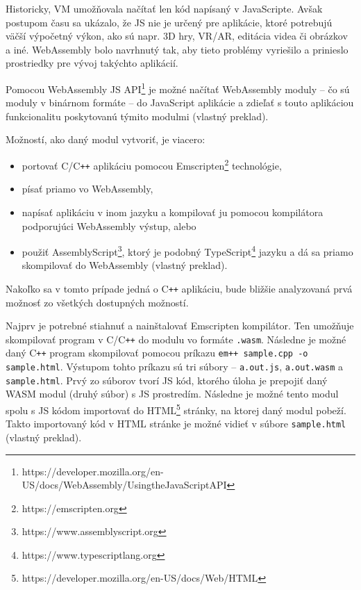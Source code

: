 Historicky, VM umožňovala načítať len kód napísaný v JavaScripte. Avšak postupom času sa ukázalo, že JS nie je určený pre aplikácie, ktoré potrebujú väčší výpočetný výkon, ako sú napr. 3D hry, VR/AR, editácia videa či obrázkov a iné.
WebAssembly bolo navrhnutý tak, aby tieto problémy vyriešilo a prinieslo prostriedky pre vývoj takýchto aplikácií. 

Pomocou WebAssembly JS API\footnote{https://developer.mozilla.org/en-US/docs/WebAssembly/Using\textunderscore the\textunderscore JavaScript\textunderscore API} je možné načítať WebAssembly moduly -- čo sú moduly v binárnom formáte -- do JavaScript aplikácie a zdieľať s touto aplikáciou funkcionalitu poskytovanú týmito modulmi \cite{webassembly_concepts} (vlastný preklad).

Možností, ako daný modul vytvoriť, je viacero:
\begin {itemize}
\item {portovať C/C\texttt{++} aplikáciu pomocou Emscripten\footnote{https://emscripten.org} technológie,}
\item {písať priamo vo WebAssembly,}
\item {napísať aplikáciu v inom jazyku a kompilovať ju pomocou kompilátora podporujúci WebAssembly výstup, alebo}
\item {použiť AssemblyScript\footnote{https://www.assemblyscript.org}, ktorý je podobný TypeScript\footnote{https://www.typescriptlang.org} jazyku a dá sa priamo skompilovať do WebAssembly \cite{webassembly_concepts} (vlastný preklad).}
\end {itemize}

Nakoľko sa v tomto prípade jedná o C\texttt{++} aplikáciu, bude bližšie analyzovaná prvá možnosť zo všetkých dostupných možností.

Najprv je potrebné stiahnuť a nainštalovať Emscripten kompilátor. Ten umožňuje skompilovať program v C/C\texttt{++} do modulu vo formáte \texttt{.wasm}. Následne je možné daný C\texttt{++} program skompilovať pomocou príkazu \newline \texttt{em++ sample.cpp -o sample.html}. Výstupom tohto príkazu sú tri súbory -- \newline \texttt{a.out.js}, \texttt{a.out.wasm} a \texttt{sample.html}. Prvý zo súborov tvorí JS kód, ktorého úloha je prepojiť daný WASM modul (druhý súbor) s JS prostredím. Následne je možné tento modul spolu s JS kódom importovať do HTML\footnote{https://developer.mozilla.org/en-US/docs/Web/HTML} stránky, na ktorej daný modul pobeží. Takto importovaný kód v HTML stránke je možné vidieť v súbore \texttt{sample.html} \cite{cpp_to_wasm} (vlastný preklad).

